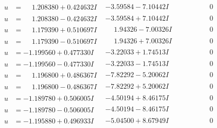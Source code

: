 \documentclass[1p]{elsarticle_modified}
\theoremstyle{definition}
\begin{document}
$$\begin{array}{c|c|c}
\begin{aligned}
u &= \phantom{-}1.208380 + 0.424632 I\end{aligned}
 & -3.59584 - 7.10442 I & \phantom{-0.000000 } 0 \\ \hline\begin{aligned}
u &= \phantom{-}1.208380 - 0.424632 I\end{aligned}
 & -3.59584 + 7.10442 I & \phantom{-0.000000 } 0 \\ \hline\begin{aligned}
u &= \phantom{-}1.179390 + 0.510697 I\end{aligned}
 & \phantom{-}1.94326 - 7.00326 I & \phantom{-0.000000 } 0 \\ \hline\begin{aligned}
u &= \phantom{-}1.179390 - 0.510697 I\end{aligned}
 & \phantom{-}1.94326 + 7.00326 I & \phantom{-0.000000 } 0 \\ \hline\begin{aligned}
u &= -1.199560 + 0.477330 I\end{aligned}
 & -3.22033 + 1.74513 I & \phantom{-0.000000 } 0 \\ \hline\begin{aligned}
u &= -1.199560 - 0.477330 I\end{aligned}
 & -3.22033 - 1.74513 I & \phantom{-0.000000 } 0 \\ \hline\begin{aligned}
u &= \phantom{-}1.196800 + 0.486367 I\end{aligned}
 & -7.82292 - 5.20062 I & \phantom{-0.000000 } 0 \\ \hline\begin{aligned}
u &= \phantom{-}1.196800 - 0.486367 I\end{aligned}
 & -7.82292 + 5.20062 I & \phantom{-0.000000 } 0 \\ \hline\begin{aligned}
u &= -1.189780 + 0.506005 I\end{aligned}
 & -4.50194 + 8.46175 I & \phantom{-0.000000 } 0 \\ \hline\begin{aligned}
u &= -1.189780 - 0.506005 I\end{aligned}
 & -4.50194 - 8.46175 I & \phantom{-0.000000 } 0 \\ \hline\begin{aligned}
u &= -1.195880 + 0.496933 I\end{aligned}
 & -5.04500 + 8.67949 I & \phantom{-0.000000 } 0 \\ \hline\begin{aligned}

\end{aligned}
\end{array}$$
\end{document}
